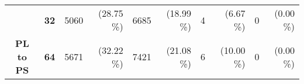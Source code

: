 \begin{table}[htb]
\begin{tabular}{c|c|rr|rr|rr|rr|}
\multicolumn{1}{|c|}{}                                                & \textbf{32}                                                                                    & 5060     & \cellcolor[HTML]{C0C0C0}(28.75 \%)    & 6685     & \cellcolor[HTML]{C0C0C0}(18.99 \%)   & 4      & \cellcolor[HTML]{C0C0C0}(6.67 \%)     & 0     & \cellcolor[HTML]{C0C0C0}(0.00 \%)     \\ \cline{2-10} 
\multicolumn{1}{|c|}{\multirow{-2}{*}{\textbf{\acs{PL} to \acs{PS}}}} & \textbf{64}                                                                                    & 5671     & \cellcolor[HTML]{C0C0C0}(32.22 \%)    & 7421     & \cellcolor[HTML]{C0C0C0}(21.08 \%)   & 6      & \cellcolor[HTML]{C0C0C0}(10.00 \%)    & 0     & \cellcolor[HTML]{C0C0C0}(0.00 \%)     \\ \hline
\end{tabular}
\end{table}